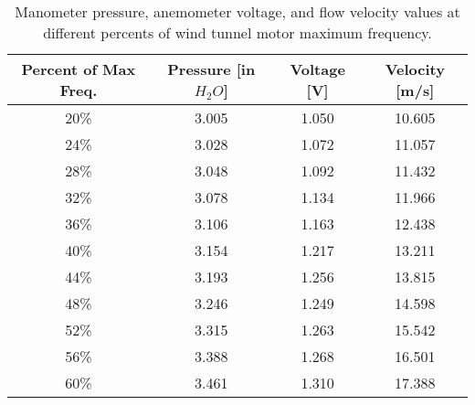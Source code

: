 \begin{table}[htpb]
    \caption{Manometer pressure, anemometer voltage, and flow velocity values at different percents of wind tunnel motor maximum frequency.}
    \label{tab:Calibration_data}
    \centering
    \begin{tabular}{cccc}
        \toprule
        Percent of Max Freq. & Pressure [in $H_2O$] & Voltage [\unit{\volt}] & Velocity [\unit{\meter/\second}]\\
        \midrule
        \num{20}\% & \num{3.005} & \num{1.050} & \num{10.605} \\
        \num{24}\% & \num{3.028} & \num{1.072} & \num{11.057} \\
        \num{28}\% & \num{3.048} & \num{1.092} & \num{11.432} \\
        \num{32}\% & \num{3.078} & \num{1.134} & \num{11.966} \\
        \num{36}\% & \num{3.106} & \num{1.163} & \num{12.438} \\
        \num{40}\% & \num{3.154} & \num{1.217} & \num{13.211} \\
        \num{44}\% & \num{3.193} & \num{1.256} & \num{13.815} \\
        \num{48}\% & \num{3.246} & \num{1.249} & \num{14.598} \\
        \num{52}\% & \num{3.315} & \num{1.263} & \num{15.542} \\
        \num{56}\% & \num{3.388} & \num{1.268} & \num{16.501} \\
        \num{60}\% & \num{3.461} & \num{1.310} & \num{17.388} \\
    \end{tabular} 
    \vspace*{5.5in}
\end{table}